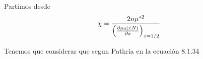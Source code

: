 \documentclass{report}
\begin{document}
\section{}

\chapter{}

\section{}

\section{}

\section{}

\section{}

\chapter{}

\section{}

Partimos desde \[\chi = \frac{2n\mu^{*2}}{\left(\frac{\partial \mu_0 \left(xN\right)}{\partial x}\right)_{x=1/2}}\]

Tenemos que considerar que segun Pathria en la ecuación 8.1.34

\section{}

\section{}

\chapter{}
\end{document}

